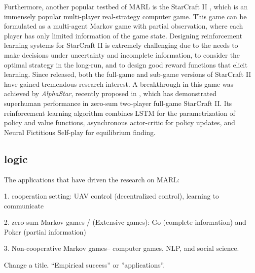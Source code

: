     
    \vspace{6pt}
\vspace{3pt} 


Furthermore, another popular testbed of MARL is the StarCraft II \cite{vinyals2017starcraft}, which is an immensely popular multi-player real-strategy computer  game.  This game can be formulated as a multi-agent Markov game with partial observation, where  each player  has only limited information of the game state. Designing reinforcement learning systems for StarCraft II is extremely challenging due to the needs to make  decisions  under uncertainty and incomplete information, to consider the optimal strategy in the long-run, and to design good reward functions that elicit learning. Since released, both the full-game and sub-game versions of  StarCraft II have gained tremendous research interest. 
A   breakthrough in this game was   achieved by    \emph{AlphaStar},   recently proposed in  \cite{vinyals2019grandmaster}, which has demonstrated superhuman performance in zero-sum two-player full-game StarCraft II.  Its reinforcement learning algorithm  combines   LSTM for the  parametrization of policy and value functions, asynchronous actor-critic  \cite{mnih2016asynchronous} for policy updates, and Neural Fictitious Self-play  \cite{heinrich2016deep} for equilibrium finding. 


 

\iffalse

\subsection{logic}
The applications that have driven the research on MARL:

1. cooperation setting: UAV control (decentralized control), learning to communicate 

2. zero-sum Markov games / (Extensive games): Go (complete information) and Poker (partial information) 

3. Non-cooperative Markov games-- computer games, NLP, and social science.


 
Change a title. ``Empirical success'' or ''applications''. 

